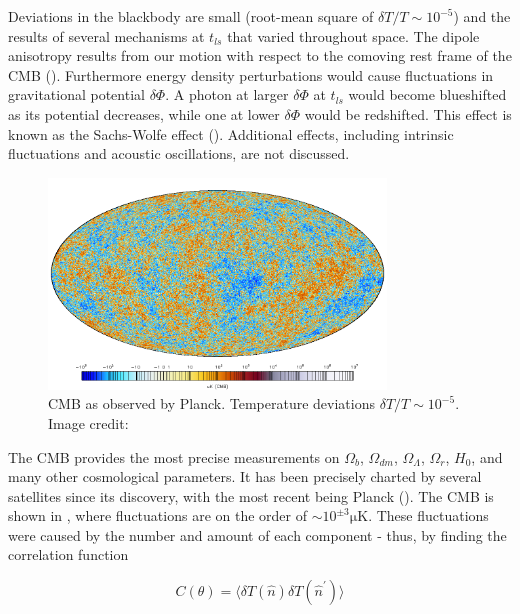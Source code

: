 Deviations in the blackbody are small (root-mean square of $\delta T/T \sim 10^{-5}$) and the results of several
mechanisms at $t_{ls}$ that varied throughout space.  The dipole anisotropy results from
our motion with respect to the comoving rest frame of the CMB ().  Furthermore
energy density perturbations would cause fluctuations in gravitational potential $\delta \Phi$.  A
photon at larger $\delta \Phi$ at $t_{ls}$ would become blueshifted as its
potential decreases, while one at lower $\delta \Phi$ would be redshifted.  This effect is known as the
Sachs-Wolfe effect ().  Additional effects, including intrinsic fluctuations and acoustic
oscillations, are not discussed.

\begin{figure}
\centering
\includegraphics[width=0.8\textwidth]{PlanckFig_map_columbi1_IDL_HighDR_colbar_1000px_CMB_moll}
\caption{CMB as observed by Planck.  Temperature deviations $\delta T/T \sim 10^{-5}$.  Image credit: \citeref{}}
\label{fig:planck_map}
\end{figure}


The CMB provides the most precise measurements on $\Omega_{b}$, $\Omega_{dm}$, $\Omega_{\Lambda}$, $\Omega_{r}$,
$H_{0}$, and many other cosmological parameters.  It has been precisely charted by several satellites since its
discovery, with the most recent being Planck ().  The CMB is shown in ,
where fluctuations are on the order of $\sim 10^{\pm 3} \mathrm{\mu K}$.  These fluctuations were caused by the number and
amount of each component - thus, by finding the correlation function

\begin{equation}
C(\theta) = \Big \langle \delta T( \hat{n}) \delta T(\hat{n}^\prime) \Big \rangle
\end{equation}

